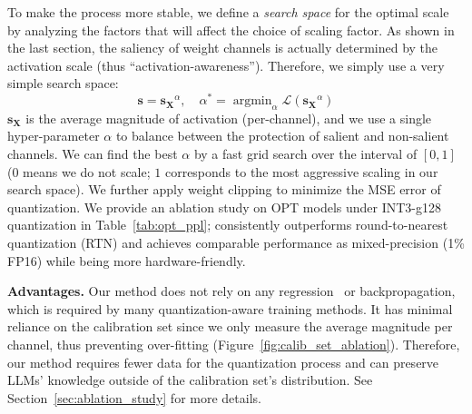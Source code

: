 To make the process more stable, we define a \emph{search space} for the optimal scale by analyzing the factors that will affect the choice of scaling factor. As shown in the last section, the saliency of weight channels is actually determined by the activation scale (thus ``activation-awareness''). Therefore, we simply use a very simple search space:
\begin{equation}
\label{eq:scale_search_formula}
    \mathbf{s}=\mathbf{s_X}^{\alpha}, \quad \alpha^*=\mathop{\arg\min}_{\alpha}\mathcal{L}(\mathbf{s_X}^{\alpha})
\end{equation}
$\mathbf{s_X}$ is the average magnitude of activation (per-channel), and we use a single hyper-parameter $\alpha$ to balance between the protection of salient and non-salient channels. We can find the best $\alpha$ by a fast grid search over the interval of $[0, 1]$ ($0$ means we do not scale; $1$  corresponds to the most aggressive scaling in our search space). We further apply weight clipping to minimize the MSE error of quantization. We provide an ablation study on OPT models under INT3-g128 quantization in Table~\ref{tab:opt_ppl}; \methodshort consistently outperforms round-to-nearest quantization (RTN) and achieves comparable performance as mixed-precision (1\% FP16) while being more hardware-friendly.



\textbf{Advantages.} 
Our method does not rely on any regression~\cite{frantar2022gptq} or backpropagation, which is required by many quantization-aware training methods. It has minimal reliance on the calibration set since we only measure the average magnitude per channel, thus preventing over-fitting (Figure~\ref{fig:calib_set_ablation}). Therefore, our method requires fewer data for the quantization process and can preserve LLMs' knowledge outside of the calibration set's distribution. 
See Section~\ref{sec:ablation_study} for more details. %
















